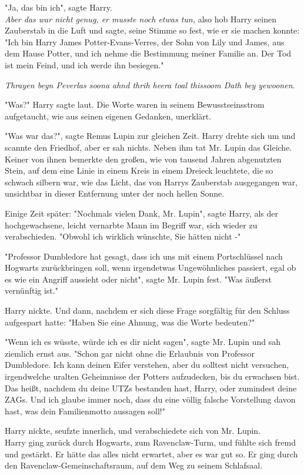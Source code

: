 {"Ja, das bin ich", sagte Harry.\\ \emph{Aber das war nicht genug, er musste noch etwas tun,} also hob Harry seinen Zauberstab in die Luft und sagte, seine Stimme so fest, wie er sie machen konnte: "Ich bin Harry James Potter-Evans-Verres, der Sohn von Lily und James, aus dem Hause Potter, und ich nehme die Bestimmung meiner Familie an. Der Tod ist mein Feind, und ich werde ihn besiegen."

\emph{Thrayen beyn Peverlas soona ahnd thrih heera toal thissoom Dath bey yewoonen.}

"Was?" Harry sagte laut. Die Worte waren in seinem Bewusstseinsstrom aufgetaucht, wie aus seinen eigenen Gedanken, unerklärt.

"Was war das?", sagte Remus Lupin zur gleichen Zeit. Harry drehte sich um und scannte den Friedhof, aber er sah nichts. Neben ihm tat Mr. Lupin das Gleiche. Keiner von ihnen bemerkte den großen, wie von tausend Jahren abgenutzten Stein, auf dem eine Linie in einem Kreis in einem Dreieck leuchtete, die so schwach silbern war, wie das Licht, das von Harrys Zauberstab ausgegangen war, unsichtbar in dieser Entfernung unter der noch hellen Sonne.

Einige Zeit später: "Nochmals vielen Dank, Mr. Lupin", sagte Harry, als der hochgewachsene, leicht vernarbte Mann im Begriff war, sich wieder zu verabschieden. "Obwohl ich wirklich wünschte, Sie hätten nicht -"

"Professor Dumbledore hat gesagt, dass ich uns mit einem Portschlüssel nach Hogwarts zurückbringen soll, wenn irgendetwas Ungewöhnliches passiert, egal ob es wie ein Angriff aussieht oder nicht", sagte Mr. Lupin fest. "Was äußerst vernünftig ist."

Harry nickte. Und dann, nachdem er sich diese Frage sorgfältig für den Schluss aufgespart hatte: "Haben Sie eine Ahnung, was die Worte bedeuten?"

"Wenn ich es wüsste, würde ich es dir nicht sagen", sagte Mr. Lupin und sah ziemlich ernst aus. "Schon gar nicht ohne die Erlaubnis von Professor Dumbledore. Ich kann deinen Eifer verstehen, aber du solltest nicht versuchen, irgendwelche uralten Geheimnisse der Potters aufzudecken, bis du erwachsen bist. Das heißt, nachdem du deine UTZs bestanden hast, Harry, oder zumindest deine ZAGs. Und ich glaube immer noch, dass du eine völlig falsche Vorstellung davon hast, was dein Familienmotto aussagen soll!"

Harry nickte, seufzte innerlich, und verabschiedete sich von Mr. Lupin.\\ Harry ging zurück durch Hogwarts, zum Ravenclaw-Turm, und fühlte sich fremd und gestärkt. Er hätte das alles nicht erwartet, aber es war gut so. Er ging durch den Ravenclaw-Gemeinschaftsraum, auf dem Weg zu seinem Schlafsaal.

}
